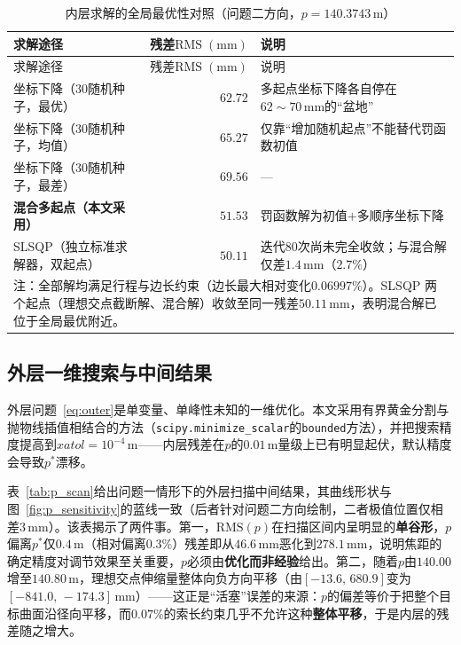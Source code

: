\documentclass[withoutpreface]{cumcmthesis}
\begin{document}
\begin{longtable}{p{6.4cm} r p{6.6cm}}
\caption{内层求解的全局最优性对照（问题二方向，$p=140.3743\,\mathrm{m}$）} \label{tab:global_opt} \\
\toprule
求解途径 & 残差$\mathrm{RMS}\;(\mathrm{mm})$ & 说明 \\
\midrule
\endfirsthead
\toprule
求解途径 & 残差$\mathrm{RMS}\;(\mathrm{mm})$ & 说明 \\
\midrule
\endhead
\bottomrule
\endfoot
\bottomrule
\endlastfoot
坐标下降（$30$随机种子，最优） & $62.72$ & 多起点坐标下降各自停在$62\sim70\,\mathrm{mm}$的``盆地'' \\
坐标下降（$30$随机种子，均值） & $65.27$ & 仅靠``增加随机起点''不能替代罚函数初值 \\
坐标下降（$30$随机种子，最差） & $69.56$ & --- \\
\textbf{混合多起点（本文采用）} & $\mathbf{51.53}$ & 罚函数解为初值$+$多顺序坐标下降 \\
SLSQP（独立标准求解器，双起点） & $50.11$ & 迭代$80$次尚未完全收敛；与混合解仅差$1.4\,\mathrm{mm}$（$2.7\%$） \\
\midrule
\multicolumn{3}{p{13.4cm}}{\small 注：全部解均满足行程与边长约束（边长最大相对变化$0.06997\%$）。SLSQP 两个起点（理想交点截断解、混合解）收敛至同一残差$50.11\,\mathrm{mm}$，表明混合解已位于全局最优附近。}\\
\bottomrule
\end{longtable}

\subsection{外层一维搜索与中间结果}

外层问题~\eqref{eq:outer}是单变量、单峰性未知的一维优化。本文采用有界黄金分割与抛物线插值相结合的方法（\texttt{scipy.minimize\_scalar}的\texttt{bounded}方法），并把搜索精度提高到$xatol=10^{-4}\,\mathrm{m}$——内层残差在$p$的$0.01\,\mathrm{m}$量级上已有明显起伏，默认精度会导致$p^{*}$漂移。

表~\ref{tab:p_scan}给出问题一情形下的外层扫描中间结果，其曲线形状与图~\ref{fig:p_sensitivity}的蓝线一致（后者针对问题二方向绘制，二者极值位置仅相差$3\,\mathrm{mm}$）。该表揭示了两件事。第一，$\mathrm{RMS}(p)$在扫描区间内呈明显的\textbf{单谷形}，$p$偏离$p^{*}$仅$0.4\,\mathrm{m}$（相对偏离$0.3\%$）残差即从$46.6\,\mathrm{mm}$恶化到$278.1\,\mathrm{mm}$，说明焦距的确定精度对调节效果至关重要，$p$必须由\textbf{优化而非经验}给出。第二，随着$p$由$140.00$增至$140.80\,\mathrm{m}$，理想交点伸缩量整体向负方向平移（由$[-13.6,\,680.9]$变为$[-841.0,\,-174.3]\,\mathrm{mm}$）——这正是``活塞''误差的来源：$p$的偏差等价于把整个目标曲面沿径向平移，而$0.07\%$的索长约束几乎不允许这种\textbf{整体平移}，于是内层的残差随之增大。
\end{document}
